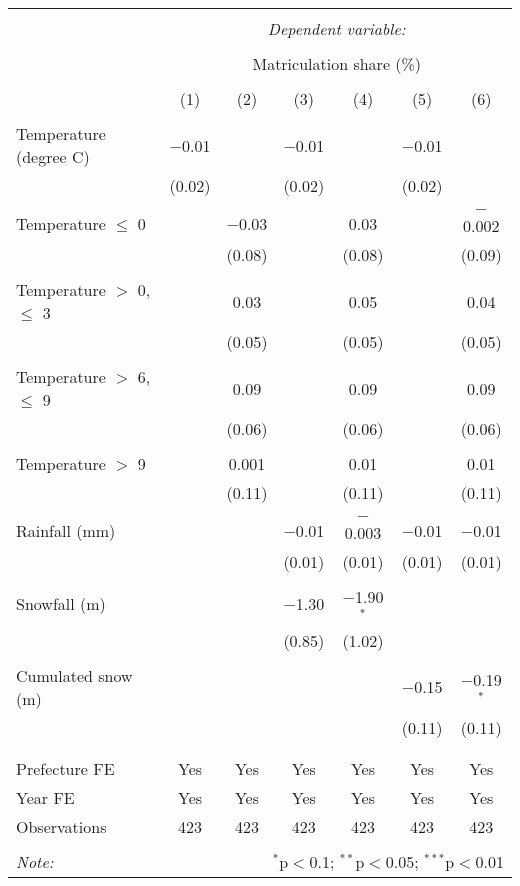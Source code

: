 
\begin{tabular}{@{\extracolsep{5pt}}lcccccc} 
\\[-1.8ex]\hline 
\hline \\[-1.8ex] 
 & \multicolumn{6}{c}{\textit{Dependent variable:}} \\ 
\cline{2-7} 
\\[-1.8ex] & \multicolumn{6}{c}{Matriculation share (\%)} \\ 
\\[-1.8ex] & (1) & (2) & (3) & (4) & (5) & (6)\\ 
\hline \\[-1.8ex] 
 Temperature (degree C) & $-$0.01 &  & $-$0.01 &  & $-$0.01 &  \\ 
  & (0.02) &  & (0.02) &  & (0.02) &  \\ 
  & & & & & & \\ 
 Temperature $\le$ 0 &  & $-$0.03 &  & 0.03 &  & $-$0.002 \\ 
  &  & (0.08) &  & (0.08) &  & (0.09) \\ 
  & & & & & & \\ 
 Temperature $>$ 0, $\le$ 3 &  & 0.03 &  & 0.05 &  & 0.04 \\ 
  &  & (0.05) &  & (0.05) &  & (0.05) \\ 
  & & & & & & \\ 
 Temperature $>$ 6, $\le$ 9 &  & 0.09 &  & 0.09 &  & 0.09 \\ 
  &  & (0.06) &  & (0.06) &  & (0.06) \\ 
  & & & & & & \\ 
 Temperature $>$ 9 &  & 0.001 &  & 0.01 &  & 0.01 \\ 
  &  & (0.11) &  & (0.11) &  & (0.11) \\ 
  & & & & & & \\ 
 Rainfall (mm) &  &  & $-$0.01 & $-$0.003 & $-$0.01 & $-$0.01 \\ 
  &  &  & (0.01) & (0.01) & (0.01) & (0.01) \\ 
  & & & & & & \\ 
 Snowfall (m) &  &  & $-$1.30 & $-$1.90$^{*}$ &  &  \\ 
  &  &  & (0.85) & (1.02) &  &  \\ 
  & & & & & & \\ 
 Cumulated snow (m) &  &  &  &  & $-$0.15 & $-$0.19$^{*}$ \\ 
  &  &  &  &  & (0.11) & (0.11) \\ 
  & & & & & & \\ 
\hline \\[-1.8ex] 
Prefecture FE & Yes & Yes & Yes & Yes & Yes & Yes \\ 
Year FE & Yes & Yes & Yes & Yes & Yes & Yes \\ 
Observations & 423 & 423 & 423 & 423 & 423 & 423 \\ 
\hline 
\hline \\[-1.8ex] 
\textit{Note:}  & \multicolumn{6}{r}{$^{*}$p$<$0.1; $^{**}$p$<$0.05; $^{***}$p$<$0.01} \\ 
\end{tabular} 

